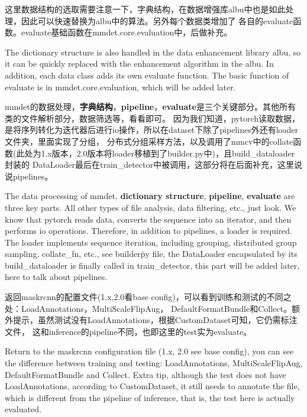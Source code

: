 \documentclass[UTF8]{ctexart}
\begin{document}
这里数据结构的选取需要注意一下，字典结构，在数据增强库albu中也是如此处理，因此可以快速替换为albu中的算法。另外每个数据类增加了
各自的evaluate函数。evaluate基础函数在mmdet.core.evaluation中，后做补充。

The dictionary structure is also handled in the data enhancement library albu, so it can be quickly replaced with the enhancement algorithm in the albu. 
In addition, each data class adds its own evaluate function. The basic function of evaluate is in mmdet.core.evaluation, 
which will be added later.

mmdet的数据处理，\textbf{字典结构}，\textbf{pipeline}，\textbf{evaluate}是三个关键部分。其他所有类的文件解析部分，数据筛选等，看看即可。
因为我们知道，pytorch读取数据，是将序列转化为迭代器后进行io操作，所以在dataset下除了pipelines外还有loader文件夹，里面实现了分组，
分布式分组采样方法，以及调用了mmcv中的collate函数(此处为1.x版本，2.0版本将loader移植到了builder.py中)，且build\_dataloader封装的
DataLoader最后在train\_detector中被调用，这部分将在后面补充，这里说说pipelines。

The data processing of mmdet, \textbf{dictionary structure}, \textbf{pipeline}, \textbf{evaluate} are three key parts. 
All other types of file analysis, data filtering, etc., just look. We know that pytorch reads data, converts the sequence 
into an iterator, and then performs io operations. Therefore, in addition to pipelines, a loader is required. The loader 
implements sequence iteration, including grouping, distributed group sampling, collate\_fn, etc., see builder\.py file, 
the DataLoader encapsulated by its build\_dataloader is finally called in train\_detector, this part will be added later, 
here to talk about pipelines.

返回maskrcnn的配置文件(1.x,2.0看base config)，可以看到训练和测试的不同之处：LoadAnnotations，MultiScaleFlipAug，
DefaultFormatBundle和Collect。额外提示，虽然测试没有LoadAnnotations，根据CustomDataset可知，它仍需标注文件，
这和inference的pipeline不同，也即这里的test实为evaluate。

Return to the maskrcnn configuration file (1.x, 2.0 see base config), you can see the difference between training and testing: LoadAnnotations, 
MultiScaleFlipAug, DefaultFormatBundle and Collect. Extra tip, although the test does not have LoadAnnotations, according to CustomDataset, 
it still needs to annotate the file, which is different from the pipeline of inference, that is, the test here is actually evaluated.
\end{document}
